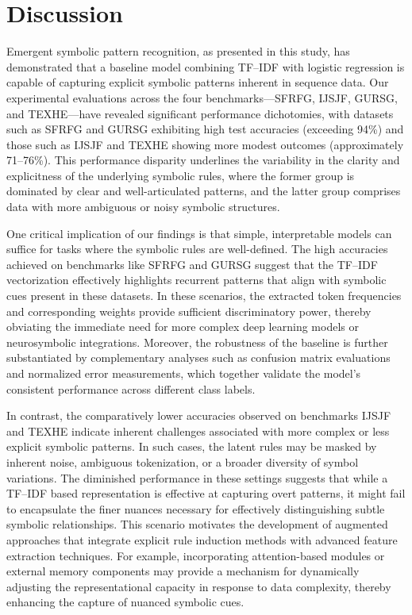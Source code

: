 \documentclass{article}
\begin{document}
\section{Discussion}
Emergent symbolic pattern recognition, as presented in this study, has demonstrated that a baseline model combining TF–IDF with logistic regression is capable of capturing explicit symbolic patterns inherent in sequence data. Our experimental evaluations across the four benchmarks—SFRFG, IJSJF, GURSG, and TEXHE—have revealed significant performance dichotomies, with datasets such as SFRFG and GURSG exhibiting high test accuracies (exceeding 94\%) and those such as IJSJF and TEXHE showing more modest outcomes (approximately 71--76\%). This performance disparity underlines the variability in the clarity and explicitness of the underlying symbolic rules, where the former group is dominated by clear and well-articulated patterns, and the latter group comprises data with more ambiguous or noisy symbolic structures.

One critical implication of our findings is that simple, interpretable models can suffice for tasks where the symbolic rules are well-defined. The high accuracies achieved on benchmarks like SFRFG and GURSG suggest that the TF–IDF vectorization effectively highlights recurrent patterns that align with symbolic cues present in these datasets. In these scenarios, the extracted token frequencies and corresponding weights provide sufficient discriminatory power, thereby obviating the immediate need for more complex deep learning models or neurosymbolic integrations. Moreover, the robustness of the baseline is further substantiated by complementary analyses such as confusion matrix evaluations and normalized error measurements, which together validate the model's consistent performance across different class labels.

In contrast, the comparatively lower accuracies observed on benchmarks IJSJF and TEXHE indicate inherent challenges associated with more complex or less explicit symbolic patterns. In such cases, the latent rules may be masked by inherent noise, ambiguous tokenization, or a broader diversity of symbol variations. The diminished performance in these settings suggests that while a TF–IDF based representation is effective at capturing overt patterns, it might fail to encapsulate the finer nuances necessary for effectively distinguishing subtle symbolic relationships. This scenario motivates the development of augmented approaches that integrate explicit rule induction methods with advanced feature extraction techniques. For example, incorporating attention-based modules or external memory components may provide a mechanism for dynamically adjusting the representational capacity in response to data complexity, thereby enhancing the capture of nuanced symbolic cues.
\end{document}
